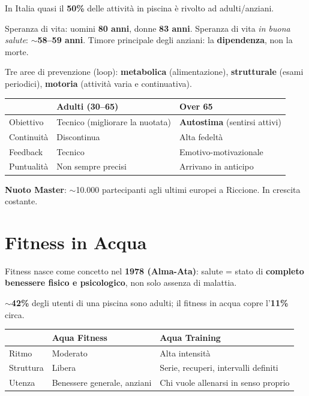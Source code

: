 \documentclass[12pt, a4paper]{article}
\begin{document}
In Italia quasi il \textbf{50\%} delle attività in piscina è rivolto ad adulti/anziani.

Speranza di vita: uomini \textbf{80 anni}, donne \textbf{83 anni}. Speranza di vita \textit{in buona salute}: $\sim$\textbf{58--59 anni}. Timore principale degli anziani: la \textbf{dipendenza}, non la morte.

Tre aree di prevenzione (loop): \textbf{metabolica} (alimentazione), \textbf{strutturale} (esami periodici), \textbf{motoria} (attività varia e continuativa).

\begin{tabularx}{\textwidth}{lXX}
\toprule
\rowcolor{light} & \textbf{Adulti (30--65)} & \textbf{Over 65} \\
\midrule
Obiettivo & Tecnico (migliorare la nuotata) & \textbf{Autostima} (sentirsi attivi) \\
Continuità & Discontinua & Alta fedeltà \\
Feedback & Tecnico & Emotivo-motivazionale \\
Puntualità & Non sempre precisi & Arrivano in anticipo \\
\bottomrule
\end{tabularx}

\textbf{Nuoto Master}: $\sim$10.000 partecipanti agli ultimi europei a Riccione. In crescita costante.

\section{Fitness in Acqua}

Fitness nasce come concetto nel \textbf{1978 (Alma-Ata)}: salute = stato di \textbf{completo benessere fisico e psicologico}, non solo assenza di malattia.

$\sim$\textbf{42\%} degli utenti di una piscina sono adulti; il fitness in acqua copre l'\textbf{11\%} circa.

\begin{tabularx}{\textwidth}{lXX}
\toprule
\rowcolor{light} & \textbf{Aqua Fitness} & \textbf{Aqua Training} \\
\midrule
Ritmo & Moderato & Alta intensità \\
Struttura & Libera & Serie, recuperi, intervalli definiti \\
Utenza & Benessere generale, anziani & Chi vuole allenarsi in senso proprio \\
\bottomrule
\end{tabularx}
\end{document}
